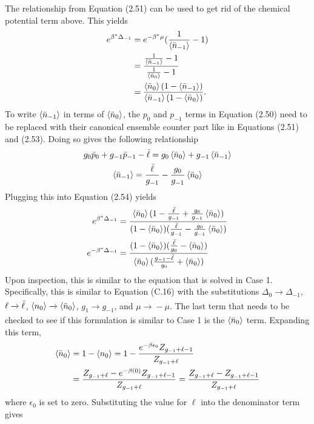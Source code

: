 The relationship from Equation (2.51) can be used to get rid of the chemical potential term above. This yields
\begin{align}
    e^{\beta^*\Delta_{-1}}&=e^{-\beta^*\mu}(\frac{1}{\left<{\Bar{n}_{-1}}\right>}-1)\nonumber\\
    &=\frac{\frac{1}{\left<{\Bar{n}_{-1}}\right>}-1}{\frac{1}{\left<{\Bar{n}_0}\right>}-1}\nonumber\\
    &=\frac{\left<{\Bar{n}_0}\right>(1-\left<{\Bar{n}_{-1}}\right>)}{\left<{\Bar{n}_{-1}}\right>(1-\left<{\Bar{n}_0}\right>)}.
\end{align}
To write $\left<{\Bar{n}_{-1}}\right>$ in terms of $\left<{\Bar{n}_0}\right>$, the $p_0$ and $p_{-1}$ terms in Equation (2.50) need to be replaced with their canonical ensemble counter part like in Equations (2.51) and (2.53). Doing so gives the following relationship
\begin{gather}
    g_0\Bar{p}_0+g_{-1}\Bar{p}_{-1}-\Bar{\ell}=g_0\left<{\Bar{n}_0}\right>+g_{-1}\left<{\Bar{n}_{-1}}\right>\\
    \left<{\Bar{n}_{-1}}\right>=\frac{\Bar{\ell}}{g_{-1}}-\frac{g_0}{g_{-1}}\left<{\Bar{n}_0}\right>
\end{gather}
Plugging this into Equation (2.54) yields
\begin{align}
    e^{\beta^*\Delta_{-1}}&=\frac{\left<{\Bar{n}_0}\right>(1-\frac{\Bar{\ell}}{g_{-1}}+\frac{g_0}{g_{-1}}\left<{\Bar{n}_0}\right>)}{(1-\left<{\Bar{n}_0}\right>)(\frac{\Bar{\ell}}{g_{-1}}-\frac{g_0}{g_{-1}}\left<{\Bar{n}_0}\right>)}\\
    e^{-\beta^*\Delta_{-1}}&=\frac{(1-\left<{\Bar{n}_0}\right>)(\frac{\Bar{\ell}}{g_0}-\left<{\Bar{n}_0}\right>)}{\left<{\Bar{n}_0}\right>(\frac{g_{-1}-\Bar{\ell}}{g_0}+\left<{\Bar{n}_0}\right>)}
\end{align}
Upon inspection, this is similar to the equation that is solved in Case 1. Specifically, this is similar to Equation (C.16) with the substitutions $\Delta_0\xrightarrow[]{}\Delta_{-1}$, $\ell\xrightarrow[]{}\Bar{\ell}$, $\left<{n_0}\right>\xrightarrow[]{}\left<{\Bar{n}_0}\right>$, $g_1\xrightarrow[]{}g_{-1}$, and $\mu \xrightarrow[]{}-\mu$. The last term that needs to be checked to see if this formulation is similar to Case 1 is the $\left<{\Bar{n}_0}\right>$ term. Expanding this term, 
\begin{align}
    \left<{\Bar{n}_0}\right>&=1-\left<{n_0}\right>=1-\frac{e^{-\beta\epsilon_0}Z_{g_{-1}+\ell-1}}{Z_{g_{-1}+\ell}}\\
    &=\frac{Z_{g_{-1}+\ell}-e^{-\beta (0)}Z_{g_{-1}+\ell-1}}{Z_{g_{-1}+\ell}}=\frac{Z_{g_{-1}+\ell}-Z_{g_{-1}+\ell-1}}{Z_{g_{-1}+\ell}}
\end{align}
where $\epsilon_0$ is set to zero. Substituting the value for $\ell$ into the denominator term gives
